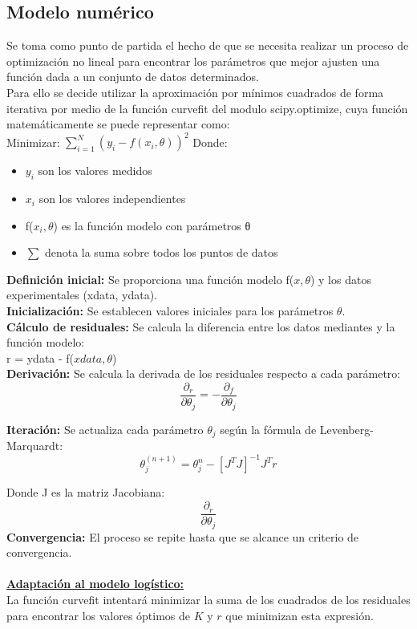 \documentclass[a4paper,10pt,twocolumn]{article}
\begin{document}
	\subsection{Modelo numérico}\label{sub:num}
Se toma como punto de partida el hecho de que se necesita realizar un proceso de optimización no lineal para encontrar los parámetros que mejor ajusten una función dada a un conjunto de datos determinados.\\ 
Para ello se decide utilizar la aproximación por mínimos cuadrados de forma iterativa por medio de la función curvefit del modulo scipy.optimize, cuya función matemáticamente se puede representar como:\\
Minimizar: $\sum_{i=1}^{N} (y_{i} - f(x_{i}, \theta))^2 $ 
Donde:\\
\begin{itemize}
	\item $y_{i}$ son los valores medidos
	\item $x_{i}$ son los valores independientes
	\item f($x_{i}, \theta$) es la función modelo con parámetros θ
	\item	$\sum$ denota la suma sobre todos los puntos de datos
\end{itemize}

\textbf{Definición inicial:} Se proporciona una función modelo f($x, \theta$) y los datos experimentales (xdata, ydata).\\
\textbf{Inicialización:} Se establecen valores iniciales para los parámetros $\theta$.\\
\textbf{Cálculo de residuales:} Se calcula la diferencia entre los datos mediantes y la función modelo:\\ r = ydata - f($xdata, \theta$)\\
\textbf{Derivación:} Se calcula la derivada de los residuales respecto a cada parámetro:\\
$$	\frac{\partial_{r}}{\partial \theta_{j}} = -\frac{\partial_{f}}{\partial \theta_{j}} $$

\textbf{Iteración:} Se actualiza cada parámetro $\theta_{j}$ según la fórmula de Levenberg-Marquardt:\\
$$\theta_{j}^{(n+1)} = \theta_{j}^{n} - [J^{T} J]^{-1} J^{T} r $$

Donde J es la matriz Jacobiana: $$\frac{\partial_{r}}{\partial \theta_{j}}$$
\textbf{Convergencia:} El proceso se repite hasta que se alcance un criterio de convergencia.\\ \\
\underline{\large{\textbf{Adaptación al modelo logístico: }}}\\
La función curvefit intentará minimizar la suma de los cuadrados de los residuales para encontrar los valores óptimos de $K$ y $r$ que minimizan esta expresión. 
\end{document}
